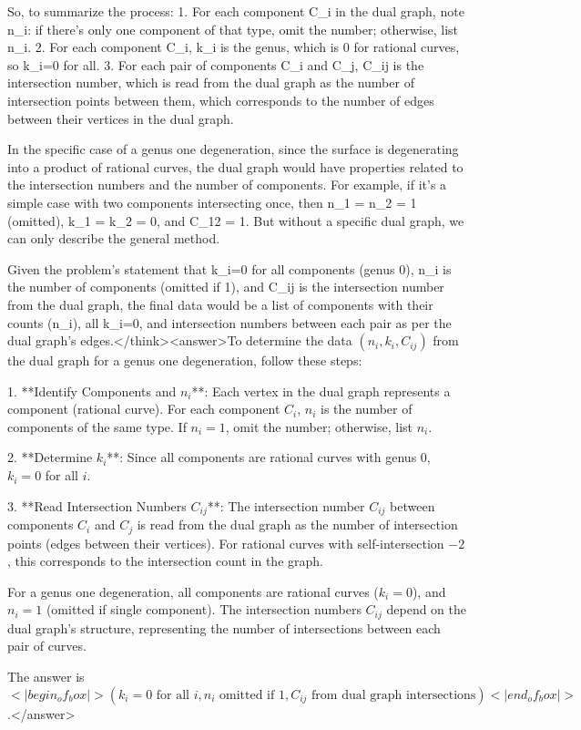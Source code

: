 So, to summarize the process: 
1. For each component C_i in the dual graph, note n_i: if there's only one component of that type, omit the number; otherwise, list n_i.
2. For each component C_i, k_i is the genus, which is 0 for rational curves, so k_i=0 for all.
3. For each pair of components C_i and C_j, C_ij is the intersection number, which is read from the dual graph as the number of intersection points between them, which corresponds to the number of edges between their vertices in the dual graph.

In the specific case of a genus one degeneration, since the surface is degenerating into a product of rational curves, the dual graph would have properties related to the intersection numbers and the number of components. For example, if it's a simple case with two components intersecting once, then n_1 = n_2 = 1 (omitted), k_1 = k_2 = 0, and C_12 = 1. But without a specific dual graph, we can only describe the general method. 

Given the problem's statement that k_i=0 for all components (genus 0), n_i is the number of components (omitted if 1), and C_ij is the intersection number from the dual graph, the final data would be a list of components with their counts (n_i), all k_i=0, and intersection numbers between each pair as per the dual graph's edges.</think><answer>To determine the data \((n_i, k_i, C_{ij})\) from the dual graph for a genus one degeneration, follow these steps:  

1. **Identify Components and \(n_i\)**:  
   Each vertex in the dual graph represents a component (rational curve). For each component \(C_i\), \(n_i\) is the number of components of the same type. If \(n_i = 1\), omit the number; otherwise, list \(n_i\).  

2. **Determine \(k_i\)**:  
   Since all components are rational curves with genus 0, \(k_i = 0\) for all \(i\).  

3. **Read Intersection Numbers \(C_{ij}\)**:  
   The intersection number \(C_{ij}\) between components \(C_i\) and \(C_j\) is read from the dual graph as the number of intersection points (edges between their vertices). For rational curves with self-intersection \(-2\), this corresponds to the intersection count in the graph.  

For a genus one degeneration, all components are rational curves (\(k_i = 0\)), and \(n_i = 1\) (omitted if single component). The intersection numbers \(C_{ij}\) depend on the dual graph's structure, representing the number of intersections between each pair of curves.  

The answer is \(<|begin_of_box|>(k_i = 0 \text{ for all } i, n_i \text{ omitted if } 1, C_{ij} \text{ from dual graph intersections})<|end_of_box|>\).</answer>
